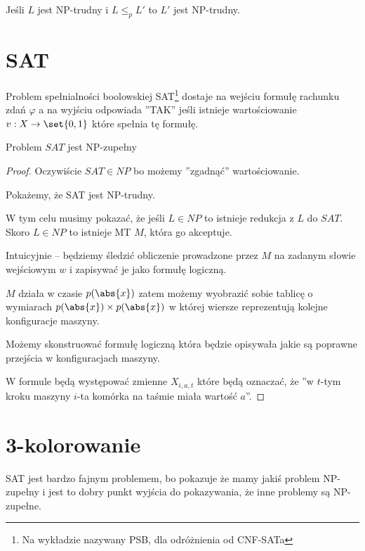 \begin{lemma}
	Jeśli \( L \) jest NP-trudny i \( L \leq_p L' \) to \( L' \) jest NP-trudny.
\end{lemma}



\section{SAT}

\begin{definition}
	Problem spełnialności boolowskiej SAT\footnote{Na wykładzie nazywany PSB, dla odróżnienia od CNF-SATa} dostaje na wejściu formułę rachunku zdań \( \varphi \) a na wyjściu odpowiada ''TAK'' jeśli istnieje wartościowanie \( v: X \rightarrow \set{0, 1} \) które spełnia tę formułę.
\end{definition}

\begin{theorem}
	Problem \( SAT \) jest NP-zupełny
\end{theorem}
\begin{proof}
	Oczywiście \(SAT \in NP\) bo możemy ''zgadnąć'' wartościowanie.

	Pokażemy, że SAT jest NP-trudny.

	W tym celu musimy pokazać, że jeśli \( L \in NP \) to istnieje redukcja z \( L \) do \( SAT \).
	Skoro \( L \in NP \) to istnieje MT \( M \), która go akceptuje.

	Intuicyjnie -- będziemy śledzić obliczenie prowadzone przez \( M \) na zadanym słowie wejściowym \( w \) i zapisywać je jako formułę logiczną.

	\( M \) działa w czasie \( p(\abs{x}) \) zatem możemy wyobrazić sobie tablicę o wymiarach \( p(\abs{x}) \times p(\abs{x}) \) w której wiersze reprezentują kolejne konfiguracje maszyny.

	Możemy skonstruować formułę logiczną która będzie opisywała jakie są poprawne przejścia w konfiguracjach maszyny.

	W formule będą występować zmienne \( X_{i, a, t} \) które będą oznaczać, że ''w \( t \)-tym kroku maszyny \( i \)-ta komórka na taśmie miała wartość \( a \)''.
\end{proof}


\section{3-kolorowanie}
SAT jest bardzo fajnym problemem, bo pokazuje że mamy jakiś problem NP-zupełny i jest to dobry punkt wyjścia do pokazywania, że inne problemy są NP-zupełne.

